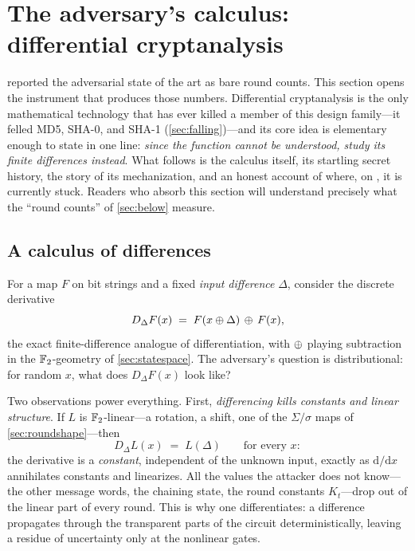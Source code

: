 \section{The adversary's calculus: differential cryptanalysis}
\label{sec:differential}

 reported the adversarial state of the art as bare round
counts. This section opens the instrument that produces those numbers.
Differential cryptanalysis is the only mathematical technology that has
ever killed a member of this design family---it felled MD5, SHA-0, and
SHA-1 (\cref{sec:falling})---and its core idea is elementary enough to
state in one line: \emph{since the function cannot be understood, study
its finite differences instead}. What follows is the calculus itself,
its startling secret history, the story of its mechanization, and an
honest account of where, on \SHA{}, it is currently stuck. Readers who
absorb this section will understand precisely what the ``round counts''
of \cref{sec:below} measure.

\subsection{A calculus of differences}\label{sec:diffcalc}

For a map $F$ on bit strings and a fixed \emph{input difference}
$\Delta$, consider the discrete derivative
\[
  D_{\Delta}F(x) \;=\; F(x \oplus \Delta) \,\oplus\, F(x),
\]
the exact finite-difference analogue of differentiation, with $\oplus$
playing subtraction in the $\mathbb{F}_2$-geometry of \cref{sec:statespace}.
The adversary's question is distributional: for random $x$, what does
$D_{\Delta}F(x)$ look like?

Two observations power everything. First, \emph{differencing kills
constants and linear structure}. If $L$ is $\mathbb{F}_2$-linear---a rotation,
a shift, one of the $\Sigma/\sigma$ maps of \cref{sec:roundshape}---then
\[
  D_{\Delta}L(x) \;=\; L(\Delta) \qquad \text{for every } x:
\]
the derivative is a \emph{constant}, independent of the unknown input,
exactly as $\mathrm{d}/\mathrm{d}x$ annihilates constants and
linearizes. All the values the attacker does not know---the other
message words, the chaining state, the round constants $K_t$---drop out
of the linear part of every round. This is why one differentiates: a
difference propagates through the transparent parts of the circuit
deterministically, leaving a residue of uncertainty only at the
nonlinear gates.

